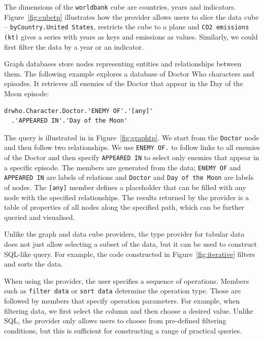 \documentclass[fleqn,11pt]{report}
\theoremstyle{definition}
\begin{document}
\noindent
The dimensions of the \texttt{worldbank} cube are countries, years and indicators.
Figure~\ref{fig:cubetp} illustrates how the provider allows users to slice the data cube --
\texttt{byCountry.\textquotesingle United States\textquotesingle},
restricts the cube to a plane and \texttt{\textquotesingle CO2 emissions (kt)\textquotesingle}
gives a series with years as keys and emissions as values. Similarly, we could first filter the
data by a year or an indicator.

Graph databases store nodes representing entities and relationships between them.
The following example explores a database of Doctor Who characters and episodes. It retrieves
all enemies of the Doctor that appear in the Day of the Moon episode:

\begin{lstlisting}[language=thegamma]
drwho.Character.Doctor.'ENEMY OF'.'[any]'
  .'APPEARED IN'.'Day of the Moon'
\end{lstlisting}

\noindent
The query is illustrated in in Figure~\ref{fig:graphtp}. We start from the \texttt{Doctor} node
and then follow two relationships. We use \texttt{\textquotesingle ENEMY
OF\textquotesingle.\textquotesingle [any]\textquotesingle}
to follow links to all enemies of the Doctor and then specify
\texttt{\textquotesingle APPEARED IN\textquotesingle}
to select only enemies that appear in a specific episode. The members are generated from the data;
\texttt{\textquotesingle ENEMY OF\textquotesingle} and \texttt{\textquotesingle APPEARED IN\textquotesingle} are labels
of relations and \texttt{Doctor} and \texttt{\textquotesingle Day of the Moon\textquotesingle} are labels of nodes. The
\texttt{[any]} member defines a placeholder that can be filled with any node with the specified
relationships. The results returned by the provider is a table of properties of all nodes
along the specified path, which can be further queried and visualised.

Unlike the graph and data cube providers, the type provider for tabular data does not just
allow selecting a subset of the data, but it can be used to construct SQL-like query.
For example, the code constructed in Figure~\ref{fig:iterative} filters and sorts the data.

When using the provider, the user specifies a sequence of operations. Members such as
\texttt{\textquotesingle filter data\textquotesingle} or \texttt{\textquotesingle sort data\textquotesingle}
determine the operation type. Those are followed by members that specify operation parameters.
For example, when filtering data, we first select the column and then choose a desired value.
Unlike SQL, the provider only allows users to choose from pre-defined filtering conditions,
but this is sufficient for constructing a range of practical queries.
\end{document}
